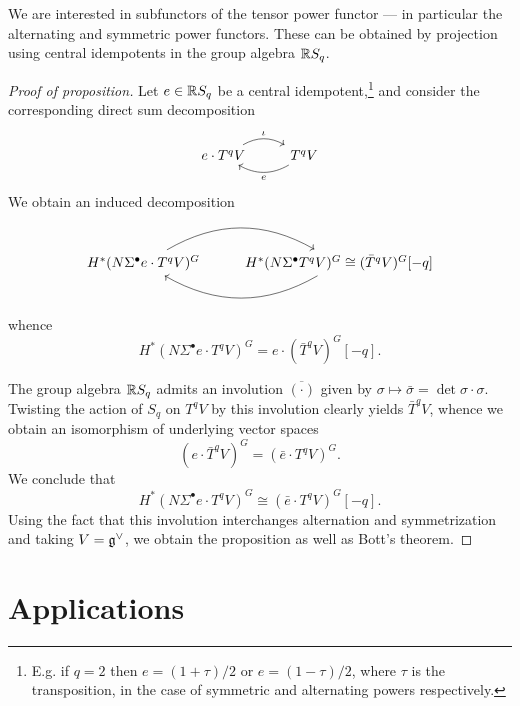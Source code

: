 \documentclass{amsart}
\begin{document}
We are interested in subfunctors of the tensor power functor --- in particular 
the alternating and symmetric power functors. These can be obtained by 
projection using central idempotents in the group algebra $\mathbb{R} S_q$.

\begin{proof}[Proof of proposition]
    Let $e\in \mathbb{R} S_q$ be a central idempotent,\footnote{E.g. if $q=2$ then 
    $e=(1+\tau)/2$ or $e=(1-\tau)/2$, where $\tau$ is the transposition, in the 
    case of symmetric and alternating powers respectively.}
    and consider the corresponding direct 
    sum decomposition
    \begin{equation*}
        \begin{tikzcd}
            e\cdot T^q V\ar[r, bend left, "\iota"] & T^q V\ar[l, bend left, "e"]
        \end{tikzcd}
    \end{equation*}
    We obtain an induced decomposition
    \begin{equation*}
        \begin{tikzcd}
            H^*(N\Sigma^\bullet e\cdot T^q V)^G\ar[r, bend left] & 
            H^*(N\Sigma^\bullet T^q V)^G\ar[l, bend left]
            \cong (\bar T^qV)^G[-q]
        \end{tikzcd}
    \end{equation*}
    whence
    \begin{equation*}
        H^*(N\Sigma^\bullet e\cdot T^q V)^G = e\cdot (\bar T^qV)^G[-q].
    \end{equation*}

    The group algebra $\mathbb{R} S_q$ admits an involution $\overline{(\cdot)}$ given by
    $\sigma\mapsto \bar\sigma=\det\sigma\cdot \sigma$. Twisting the action of $S_q$ 
    on $T^qV$ by this involution clearly yields $\bar T^qV$, whence we obtain an 
    isomorphism of underlying vector spaces
    \begin{equation*}
        (e \cdot \bar T^qV)^G = (\bar e \cdot T^q V)^G.
    \end{equation*}
    We conclude that
    \begin{equation*}
        H^*(N\Sigma^\bullet e\cdot T^q V)^G \cong (\bar e \cdot T^q V)^G[-q].
    \end{equation*}
    Using the fact that this involution interchanges alternation and
    symmetrization and taking $V=\mathfrak g^\vee$, we obtain the proposition as well 
    as Bott's theorem.
\end{proof}


\section{Applications}
\end{document}
